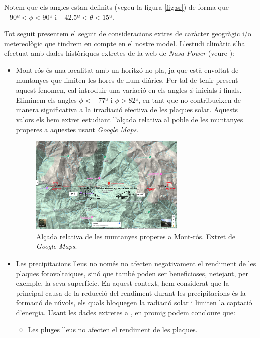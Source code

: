 \documentclass[10pt, twoside, a4paper]{article}
\begin{document}
Notem que els angles estan definits (vegeu la figura \ref{fig:sr}) de forma que $-90\text{º}<\phi < 90$º i $-42.5\text{º} < \theta < 15$º.

Tot seguit presentem el seguit de consideracions extres de caràcter geogràgic i/o metereològic que tindrem en compte en el nostre model. L'estudi climàtic s'ha efectuat amb dades històriques extretes de la web de \textit{Nasa Power} (veure \cite{ref6}):
\begin{itemize}
    \item Mont-rós és una localitat amb un horitzó no pla, ja que està envoltat de muntanyes que limiten les hores de llum diàries. Per tal de tenir present aquest fenomen, cal introduir una variació en els angles $\phi$ inicials i finals. Eliminem els angles $\phi < -77$º i $\phi > 82$º, en tant que no contribueixen de manera significativa a la irradiació efectiva de les plaques solar. Aquests valors els hem extret estudiant l'alçada relativa al poble de les muntanyes properes a aquestes usant \textit{Google Maps}. 
    \begin{figure}[h!]
        \centering
        \includegraphics[width=0.7\textwidth]{MapaMuntanyes.jpg}
        \caption{Alçada relativa de les muntanyes properes a Mont-rós. Extret de \textit{Google Maps}. }
        \label{fig:alçada_muntanyes}
    \end{figure}
    \item Les precipitacions lleus no només no afecten negativament el rendiment de les plaques fotovoltaiques, sinó que també poden ser beneficioses, netejant, per exemple, la seva superfície. En aquest context, hem considerat que la principal causa de la reducció del rendiment durant les precipitacions és la formació de núvols, els quals bloquegen la radiació solar i limiten la captació d'energia. Usant les dades extretes a \cite{ref9}, en promig podem concloure que:
    \begin{itemize}
        \item Les pluges lleus no afecten el rendiment de les plaques.

\end{itemize}
\end{itemize}
\end{document}
